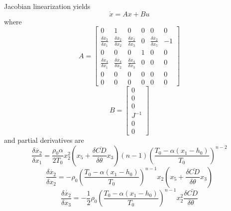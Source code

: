 \documentclass{article}
\begin{document}
  Jacobian linearization yields
  \begin{equation}
    \dot{x} = Ax + Bu
  \end{equation}
  where
  \begin{equation}
    A = \left[\begin{matrix} 0 & 1 & 0 & 0 & 0 & 0                   \\
                             \frac{\delta \dot{x_2}}{\delta x_1} & \frac{\delta \dot{x_2}}{\delta x_2} & \frac{\delta \dot{x_2}}{\delta x_3} & 0 & \frac{\delta \dot{x_2}}{\delta x_5} & -1                      \\
                             0 & 0 & 0 & 1 & 0 & 0                    \\
                             \frac{\delta \dot{x_4}}{\delta x_1} & \frac{\delta \dot{x_4}}{\delta x_2} & \frac{\delta \dot{x_4}}{\delta x_3} & 0 & 0 & 0                      \\
                             0 & 0 & 0 & 0 & 0 & 0                      \\
                             0 & 0 & 0 & 0 & 0 & 0              \end{matrix}\right]
  \end{equation}
  \begin{equation}
    B = \left[\begin{matrix} 0 \\
                             0 \\
                             0 \\
                             J^{-1} \\
                             0 \\
                             0      \end{matrix}\right]
  \end{equation}
  and partial derivatives are
  \begin{equation}
    \frac{\delta \dot{x_2}}{\delta x_1} = \frac{\rho_0 \alpha}{2 T_0}x_2^2 \left( x_5 + \frac{\delta \bar{CD}}{\delta \theta} x_3 \right) \left( n-1 \right) \left( \frac{T_0-\alpha \left( x_1 - h_0\right)}{T_0} \right)^{n-2}
  \end{equation}
  \begin{equation}
    \frac{\delta \dot{x_2}}{\delta x_2} = -\rho_0 \left( \frac{T_0-\alpha \left( x_1 - h_0\right)}{T_0} \right)^{n-1} x_2 \left( x_5 + \frac{\delta \bar{CD}}{\delta \theta} x_3 \right)
  \end{equation}
  \begin{equation}
    \frac{\delta \dot{x_2}}{\delta x_3} = -\frac{1}{2}\rho_0 \left( \frac{T_0-\alpha \left( x_1 - h_0\right)}{T_0} \right)^{n-1} x_2^2 \frac{\delta \bar{CD}}{\delta \theta}
  \end{equation}
\end{document}
